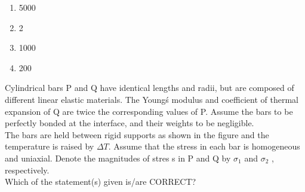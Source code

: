 	\begin{enumerate}
		\item 5000
		\item 2
		\item 1000
		\item 200
	\end{enumerate}
\item Cylindrical bars P and Q have identical lengths and radii, but are composed of different linear elastic materials. The Young\'s modulus and coefficient of thermal expansion of Q are twice the corresponding 
	values of P. Assume the bars to be perfectly bonded at the interface, and their weights to be negligible. \\
	The bars are held between rigid supports as shown in the figure and the temperature is raised by $\Delta T$. Assume that the stress in each bar is homogeneous and uniaxial. Denote the magnitudes of stres
	s in P and Q by $\sigma_1$ and $\sigma_2$ , respectively. \\
	Which of the statement(s) given is/are CORRECT?
